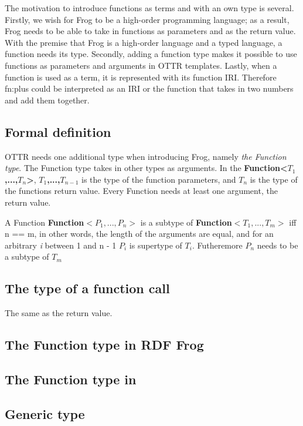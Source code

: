 \para
The motivation to introduce functions as terms and with an own type is several. Firstly, we wish for Frog to be a high-order programming language; as a result, Frog needs to be able to take in functions as parameters and as the return value.  With the premise that Frog is a high-order language and a typed language, a function needs its type. Secondly, adding a function type makes it possible to use functions as parameters and arguments in  OTTR templates. Lastly, when a function is used as a term, it is represented with its function IRI. Therefore fn:plus could be interpreted as an IRI or the function that takes in two numbers and add them together. 

\subsection{Formal definition}
OTTR needs one additional type when introducing Frog, namely \emph{the Function type}. The Function type takes in other types as arguments. In the \textbf{Function<$T_1$,...,$T_n$>},\textbf{ $T_1$,...,$T_{n - 1}$} is the type of the function parameters, and \textbf{$T_n$} is the type of the functions return value. Every Function needs at least one argument, the return value. 

\para
A Function \textbf{Function$<P_1,...,P_n>$} is a subtype of \textbf{Function$<T_1,...,T_m>$} iff n == m, in other words, the length of the arguments are equal, and for an arbitrary \textit{i} between 1 and n - 1  \textbf{$P_i$} is supertype of \textbf{$T_i$}. Futheremore \textbf{$P_n$} needs to be a subtype of \textbf{$T_m$}

\subsection{The type of a function call}
The same as the return value.

\subsection{The Function type in RDF Frog}

\subsection{The Function type in }

\subsection{Generic type}

